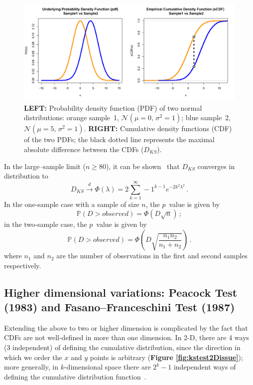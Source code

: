 \documentclass[codesnippet]{jss}
\begin{document}
\begin{figure}[hbt]
\centering
\includegraphics{pdfvsCDF}
\caption{\label{fig:kstest1D} \textbf{LEFT:} Probability density
function (PDF) of two normal distributions: orange sample~1,
$\mathcal{N}(\mu = 0,\,\sigma^{2} = 1)$; blue sample~2,
$\mathcal{N}(\mu = 5,\,\sigma^{2} = 1)$. \textbf{RIGHT:} Cumulative
density functions (CDF) of the two PDFs; the black dotted line
represents the maximal absolute difference between the CDFs
($D_{KS}$).  }
\end{figure}

In the large--sample limit ($n \geq 80$), it can be
shown~\citep{Kendall1946} that $D_{KS}$ converges in distribution to
\begin{equation} \label{eq:1}
D_{KS} \overset{d}{\rightarrow} \Phi(\lambda) = 2 \sum_{k=1}^{\infty} -1^{k-1}e^{-2k^2\lambda^2} \,.
\end{equation}
In the one-sample case with a sample of size $n$, the $p$~value is given by
\begin{equation} \label{eq:2}
\mathbb{P}(D > observed) = \Phi ( D\sqrt{n})\,;
\end{equation}
in the two-sample case, the $p$~value is given by
\begin{equation} \label{eq:3}
\mathbb{P}(D > observed) = \Phi \left( D\sqrt{\frac{n_1n_2}{n_1+n_2}} \right)\,.
\end{equation}
where $n_1$ and $n_2$ are the number of observations in the first and second samples respectively.

\subsection{Higher dimensional variations: Peacock Test (1983) and Fasano--Franceschini Test (1987)}
Extending the above to two or higher dimension is complicated by the
fact that CDFs are not well-defined in more than one dimension.  In
2-D, there are 4 ways (3 independent) of defining the cumulative
distribution, since the direction in which we order the $x$ and $y$
points is arbitrary (\textbf{Figure \ref{fig:kstest2Dissue}}); more
generally, in $k$-dimensional space there are $2^{k}-1$ independent
ways of defining the cumulative distribution
function~\citep{Peacock1983}.
\end{document}
